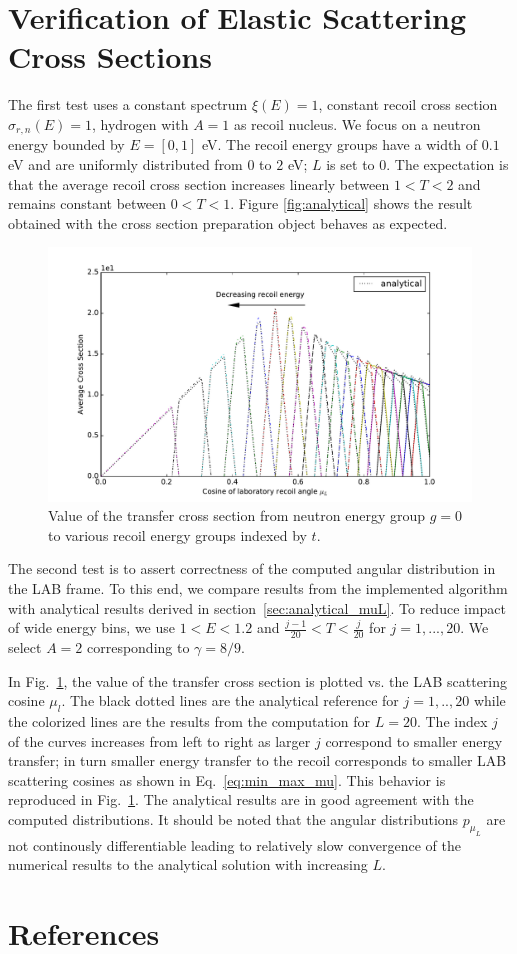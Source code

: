 \documentclass[review]{elsarticle}
\begin{document}
\section{Verification of Elastic Scattering Cross Sections}
The first test uses a constant spectrum $\xi(E)=1$, constant recoil cross section $\sigma_{r,n}(E)=1$, hydrogen with $A=1$ as recoil nucleus. We focus on a neutron energy bounded by $E=[0,1]$ eV. The recoil energy groups have a width of $0.1$ eV and are uniformly distributed from $0$ to $2$ eV; $L$ is set to $0$. The expectation is that the average recoil cross section increases linearly between $1<T<2$ and remains constant between $0<T<1$.  Figure \ref{fig:analytical} shows the result obtained with the cross section preparation object behaves as expected. 
\begin{figure}[t!]
	\centering
	\includegraphics[width=1\linewidth]{erxs_analytical_mu.pdf}
	\caption{Value of the transfer cross section from neutron energy group $g=0$ to various recoil energy groups indexed by $t$.}
	\label{fig:analytical_vs_angle}
\end{figure}


The second test is to assert correctness of the computed angular distribution in the LAB frame. To this end, we compare results from the implemented algorithm with 
analytical results derived in section~\ref{sec:analytical_muL}. To reduce impact of wide energy bins, we use $1<E< 1.2$ and $\frac{j-1}{20}< T < \frac{j}{20}$ for $j=1,...,20$.
We select $A=2$ corresponding to $\gamma = 8/9$.

In Fig.~\ref{fig:analytical_vs_angle}, the value of the transfer cross section is plotted vs. the LAB scattering cosine $\mu_l$. The black dotted lines are the analytical reference for $j=1,..,20$ while the colorized lines are the results from the computation for $L=20$. 
The index $j$ of the curves increases from left to right as larger $j$ correspond to smaller energy transfer; in turn smaller energy transfer to the recoil corresponds to smaller LAB scattering cosines as shown in Eq.~\ref{eq:min_max_mu}. This behavior is reproduced in Fig.~\ref{fig:analytical_vs_angle}. The analytical results are in good agreement with the computed distributions. It should be noted that the angular distributions $p_{\mu_L}$ are not continously differentiable leading to relatively slow convergence of the numerical results to the analytical solution with increasing $L$.

\clearpage
\section*{References}

\end{document}
